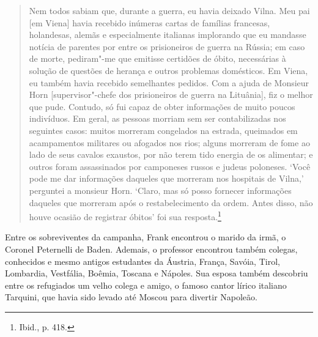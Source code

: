 \begin{quote}
Nem todos sabiam que, durante a guerra, eu havia deixado Vilna. Meu pai
{[}em Viena{]} havia recebido inúmeras cartas de famílias francesas,
holandesas, alemãs e especialmente italianas implorando que eu mandasse
notícia de parentes por entre os prisioneiros de guerra na Rússia; em
caso de morte, pediram"-me que emitisse certidões de óbito, necessárias à
solução de questões de herança e outros problemas domésticos. Em Viena,
eu também havia recebido semelhantes pedidos. Com a ajuda de Monsieur
Horn {[}supervisor"-chefe dos prisioneiros de guerra na Lituânia{]}, fiz
o melhor que pude. Contudo, só fui capaz de obter informações de muito
poucos indivíduos. Em geral, as pessoas morriam sem ser contabilizadas
nos seguintes casos: muitos morreram congelados na estrada, queimados em
acampamentos militares ou afogados nos rios; alguns morreram de fome ao
lado de seus cavalos exaustos, por não terem tido energia de os
alimentar; e outros foram assassinados por camponeses russos e judeus
poloneses. `Você pode me dar informações daqueles que morreram nos
hospitais de Vilna,' perguntei a monsieur Horn. `Claro, mas só posso
fornecer informações daqueles que morreram após o restabelecimento da
ordem. Antes disso, não houve ocasião de registrar óbitos' foi sua
resposta.\footnote{Ibid., p. 418.}
\end{quote}

Entre os sobreviventes da campanha, Frank encontrou o marido da irmã, o
Coronel Peternelli de Baden. Ademais, o professor encontrou também
colegas, conhecidos e mesmo antigos estudantes da Áustria, França,
Savóia, Tirol, Lombardia, Vestfália, Boêmia, Toscana e Nápoles. Sua
esposa também descobriu entre os refugiados um velho colega e amigo, o
famoso cantor lírico italiano Tarquini, que havia sido levado até Moscou
para divertir Napoleão.

